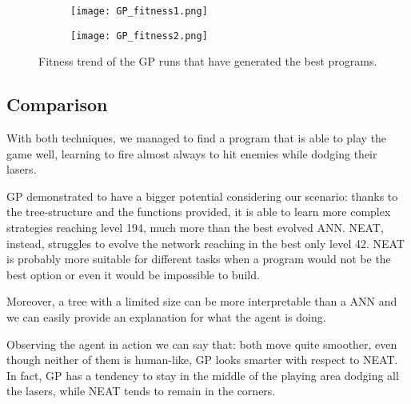 \begin{figure*}[t!]
    \centering
    \begin{subfigure}[b]{0.45\textwidth}
        \centerline{\texttt{[image: GP\_fitness1.png]}}
        \caption{}
        \label{fig:GP_fitness1}
    \end{subfigure}
    \hfill
    \begin{subfigure}[b]{0.45\textwidth}
        \centerline{\texttt{[image: GP\_fitness2.png]}}
        \caption{}
        \label{fig:GP_fitness2}
    \end{subfigure}
       \caption{Fitness trend of the GP runs that have generated the best programs.}
       \label{fig:GP_fitness}
\end{figure*}




\subsection{Comparison}
With both techniques, we managed to find a program that is able to play the game well,
learning to fire almost always to hit enemies while dodging their lasers.

GP demonstrated to have a bigger potential considering our scenario: thanks to the
tree-structure and the functions provided, it is able to learn more complex strategies
reaching level 194, much more than the best evolved ANN. NEAT, instead, struggles to
evolve the network reaching in the best only level 42. NEAT is probably more suitable for
different tasks when a program would not be the best option or even it would be impossible
to build.

Moreover, a tree with a limited size can be more interpretable than a ANN and we can easily
provide an explanation for what the agent is doing.

Observing the agent in action we can say that: both move quite smoother, even though
neither of them is human-like, GP looks smarter with respect to NEAT. In fact, GP has a
tendency to stay in the middle of the playing area dodging all the lasers, while NEAT tends to
remain in the corners.

